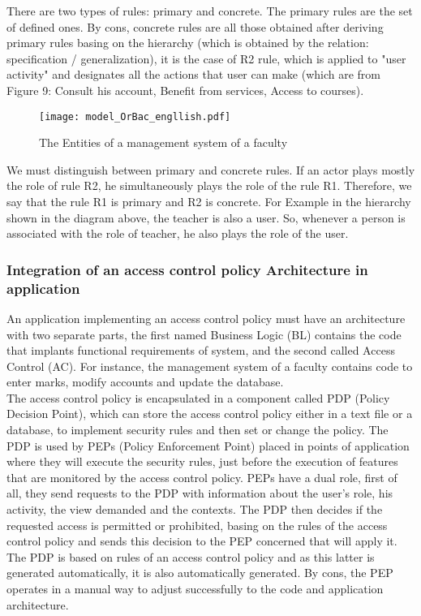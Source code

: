 \documentclass{acm_proc_article-sp}
\begin{document}
There are two types of rules: primary and concrete. The primary rules are the set of defined ones. By cons, concrete rules are all those obtained after deriving primary rules basing on the hierarchy (which is obtained by the relation: specification / generalization), it is the case of R2 rule, which is applied to "user activity" and designates all the actions that user can make (which are from Figure 9: Consult his account, Benefit from services, Access to courses).
\begin{figure}[h!]                                                       \centering                                                               \texttt{[image: model\_OrBac\_engllish.pdf]} \caption{The Entities of a management system of a faculty}               \label{The Entities of a management system of a faculty}                 \end{figure}                                                             We must distinguish between  primary  and concrete rules. If an actor plays mostly the role of rule R2, he simultaneously plays the role of the rule R1. Therefore, we say that the rule R1 is primary and R2 is concrete. For Example in the hierarchy shown in the diagram above, the teacher is also a user. So, whenever a person is associated with the role of teacher, he also plays the role of the user.

\subsubsection{Integration of an access control policy Architecture in application}
An application implementing an access control policy must have an architecture with two separate parts, the first named Business Logic (BL) contains the code that implants functional requirements of system, and the second called Access Control (AC). For instance, the management system of a faculty contains code to enter marks, modify accounts and update the database.\\
The access control policy is encapsulated in a component called PDP (Policy Decision Point), which can store the access control policy either in a text file or a database, to implement security rules and then set or change the policy. The PDP is used by PEPs (Policy Enforcement Point) placed in points of application where they will execute the security rules, just before the execution of features that are monitored by the access control policy. PEPs have a dual role, first of all, they send requests to the PDP with information about the user's role, his activity, the view demanded and the contexts. The PDP then decides if the requested access is permitted or prohibited, basing on the rules of the access control policy and sends this decision to the PEP concerned that will apply it.\\
The PDP is based on rules of an access control policy and as this latter is generated automatically, it is also automatically generated. By cons, the PEP operates in a manual way to adjust successfully to the code and application architecture.
\end{document}
